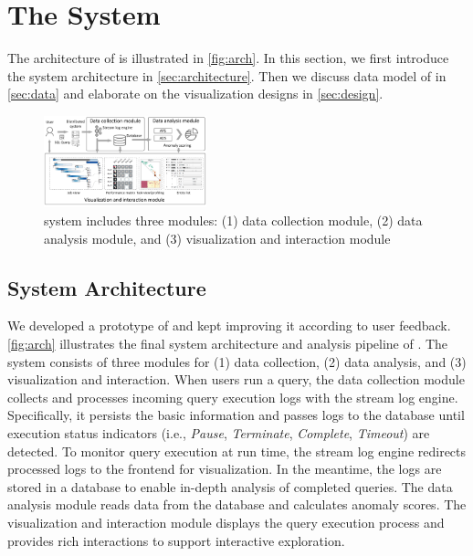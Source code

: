 \section{The \qevis{} System}\label{sec:qevis}
The architecture of \qevis{} is illustrated in \autoref{fig:arch}.
In this section, we first introduce the system architecture in \autoref{sec:architecture}. Then we discuss data model of \qevis{} in \autoref{sec:data} and elaborate on the visualization designs 
in \autoref{sec:design}.


\begin{figure}[t]
	\centering
	\includegraphics[width=0.42\textwidth]{figures/framework/Systemframework.pdf}
	\vspace{-3mm}
	\caption{ 
		\qevis{} system includes three modules: (1) data collection module, (2) data analysis module, and (3) visualization and interaction module
	}
	\label{fig:arch}
	\vspace{-3mm}
\end{figure}


\subsection{System Architecture} \label{sec:architecture}
We developed a prototype of \qevis{} and kept improving it according to user feedback. 
\autoref{fig:arch} illustrates the final system architecture and analysis pipeline of \qevis{}. 
The system consists of three modules for (1) data collection, (2) data analysis, and (3) visualization and interaction. 	
When users run a query, the data collection module collects and processes incoming query execution logs with the stream log engine.
Specifically, it persists the basic information and passes logs to the database until execution status indicators (i.e.,  \textit{Pause}, \textit{Terminate}, \textit{Complete}, \textit{Timeout}) are detected.  
To monitor query execution at run time, the stream log engine redirects processed logs to the frontend for visualization.
In the meantime, the logs are stored in a database to enable in-depth analysis of completed queries.
The data analysis module reads data from the database and calculates anomaly scores. 
The visualization and interaction module displays the query execution process and provides rich interactions to support interactive exploration.


